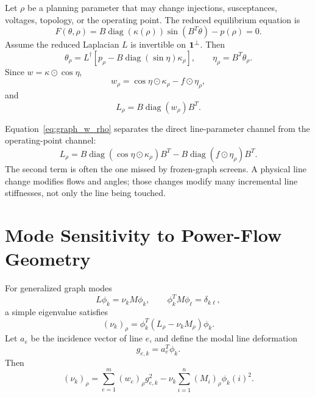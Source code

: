 Let \(\rho\) be a planning parameter that may change injections,
susceptances, voltages, topology, or the operating point. The reduced
equilibrium equation is
\begin{equation}
  F(\theta,\rho)
  =
  B\operatorname{diag}(\kappa(\rho))\sin(B^T\theta)-p(\rho)=0.
  \label{eq:graph_equilibrium_F}
\end{equation}
Assume the reduced Laplacian \(L\) is invertible on \(\mathbf 1^\perp\). Then
\begin{equation}
  \theta_\rho
  =
  L^\dagger
  \left[
  p_\rho-B\operatorname{diag}(\sin\eta)\kappa_\rho
  \right],
  \qquad
  \eta_\rho=B^T\theta_\rho.
  \label{eq:graph_theta_rho}
\end{equation}
Since \(w=\kappa\odot\cos\eta\),
\begin{equation}
  w_\rho
  =
  \cos\eta\odot\kappa_\rho
  -
  f\odot\eta_\rho,
  \label{eq:graph_w_rho}
\end{equation}
and
\begin{equation}
  L_\rho=B\operatorname{diag}(w_\rho)B^T.
  \label{eq:graph_L_rho}
\end{equation}

Equation~\eqref{eq:graph_w_rho} separates the direct line-parameter channel
from the operating-point channel:
\begin{equation}
  L_\rho
  =
  B\operatorname{diag}(\cos\eta\odot\kappa_\rho)B^T
  -
  B\operatorname{diag}(f\odot\eta_\rho)B^T.
  \label{eq:graph_L_rho_split}
\end{equation}
The second term is often the one missed by frozen-graph screens. A physical
line change modifies flows and angles; those changes modify many incremental
line stiffnesses, not only the line being touched.

\section{Mode Sensitivity to Power-Flow Geometry}

For generalized graph modes
\begin{equation}
  L\phi_k=\nu_kM\phi_k,
  \qquad
  \phi_k^TM\phi_\ell=\delta_{k\ell},
  \label{eq:graph_generalized_modes}
\end{equation}
a simple eigenvalue satisfies
\begin{equation}
  (\nu_k)_\rho
  =
  \phi_k^T(L_\rho-\nu_kM_\rho)\phi_k.
  \label{eq:graph_nu_rho_general}
\end{equation}
Let \(a_e\) be the incidence vector of line \(e\), and define the modal line
deformation
\begin{equation}
  g_{e,k}=a_e^T\phi_k.
  \label{eq:graph_modal_line_deformation}
\end{equation}
Then
\begin{equation}
  (\nu_k)_\rho
  =
  \sum_{e=1}^m (w_e)_\rho g_{e,k}^2
  -
  \nu_k\sum_{i=1}^n (M_i)_\rho \phi_k(i)^2.
  \label{eq:graph_nu_rho_edges}
\end{equation}

